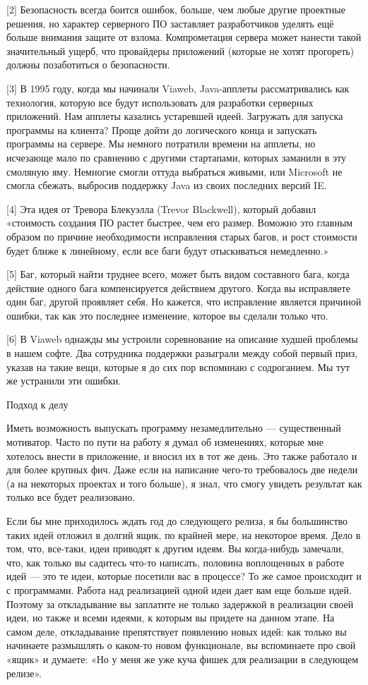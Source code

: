 \documentclass[ebook,12pt,oneside,openany]{memoir}
\begin{document}
[2] Безопасность всегда боится ошибок, больше, чем любые другие
проектные решения, но характер серверного ПО заставляет разработчиков
уделять ещё больше внимания защите от взлома. Компрометация сервера
может нанести такой значительный ущерб, что провайдеры приложений
(которые не хотят прогореть) должны позаботиться о безопасности.

[3] В 1995 году, когда мы начинали Viaweb, Java-апплеты
рассматривались как технология, которую все будут использовать для
разработки серверных приложений. Нам апплеты казались устаревшей
идеей. Загружать для запуска программы на клиента? Проще дойти до
логического конца и запускать программы на сервере. Мы немного
потратили времени на апплеты, но исчезающе мало по сравнению с другими
стартапами, которых заманили в эту смоляную яму. Немногие смогли
оттуда выбраться живыми, или Microsoft не смогла сбежать, выбросив
поддержку Java из своих последних версий IE.

[4] Эта идея от Тревора Блекуэлла (Trevor Blackwell), который добавил
«стоимость создания ПО растет быстрее, чем его размер. Воможно это
главным образом по причине необходимости исправления старых багов, и
рост стоимости будет ближе к линейному, если все баги будут
отыскиваться немедленно.»

[5] Баг, который найти труднее всего, может быть видом составного
бага, когда действие одного бага компенсируется действием другого.
Когда вы исправляете один баг, другой проявляет себя. Но кажется, что
исправление является причиной ошибки, так как это последнее изменение,
которое вы сделали только что.

[6] В Viaweb однажды мы устроили соревнование на описание худшей
проблемы в нашем софте. Два сотрудника поддержки разыграли между собой
первый приз, указав на такие вещи, которые я до сих пор вспоминаю с
содроганием. Мы тут же устранили эти ошибки.

Подход к делу

Иметь возможность выпускать программу незамедлительно — существенный
мотиватор. Часто по пути на работу я думал об изменениях, которые мне
хотелось внести в приложение, и вносил их в тот же день. Это также
работало и для более крупных фич. Даже если на написание чего-то
требовалось две недели (а на некоторых проектах и того больше), я
знал, что смогу увидеть результат как только все будет реализовано.

Если бы мне приходилось ждать год до следующего релиза, я бы
большинство таких идей отложил в долгий ящик, по крайней мере, на
некоторое время. Дело в том, что, все-таки, идеи приводят к другим
идеям. Вы когда-нибудь замечали, что, как только вы садитесь что-то
написать, половина воплощенных в работе идей — это те идеи, которые
посетили вас в процессе? То же самое происходит и с программами.
Работа над реализацией одной идеи дает вам еще больше идей. Поэтому за
откладывание вы заплатите не только задержкой в реализации своей идеи,
но также и всеми идеями, к которым вы придете на данном этапе. На
самом деле, откладывание препятствует появлению новых идей: как только
вы начинаете размышлять о каком-то новом функционале, вы вспоминаете
про свой «ящик» и думаете: «Но у меня же уже куча фишек для реализации
в следующем релизе».
\end{document}
